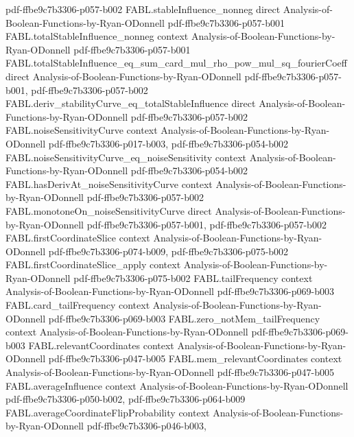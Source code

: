 \begin{theorem}
{    pdf-ffbe9c7b3306-p057-b002}
\proofstep
  {FABL.stableInfluence_nonneg}
  {direct}
  {Analysis-of-Boolean-Functions-by-Ryan-ODonnell}
  {pdf-ffbe9c7b3306-p057-b001}
\proofstep
  {FABL.totalStableInfluence_nonneg}
  {context}
  {Analysis-of-Boolean-Functions-by-Ryan-ODonnell}
  {pdf-ffbe9c7b3306-p057-b001}
\proofstep
  {FABL.totalStableInfluence_eq_sum_card_mul_rho_pow_mul_sq_fourierCoeff}
  {direct}
  {Analysis-of-Boolean-Functions-by-Ryan-ODonnell}
  {pdf-ffbe9c7b3306-p057-b001,
    pdf-ffbe9c7b3306-p057-b002}
\proofstep
  {FABL.deriv_stabilityCurve_eq_totalStableInfluence}
  {direct}
  {Analysis-of-Boolean-Functions-by-Ryan-ODonnell}
  {pdf-ffbe9c7b3306-p057-b002}
\proofstep
  {FABL.noiseSensitivityCurve}
  {context}
  {Analysis-of-Boolean-Functions-by-Ryan-ODonnell}
  {pdf-ffbe9c7b3306-p017-b003,
    pdf-ffbe9c7b3306-p054-b002}
\proofstep
  {FABL.noiseSensitivityCurve_eq_noiseSensitivity}
  {context}
  {Analysis-of-Boolean-Functions-by-Ryan-ODonnell}
  {pdf-ffbe9c7b3306-p054-b002}
\proofstep
  {FABL.hasDerivAt_noiseSensitivityCurve}
  {context}
  {Analysis-of-Boolean-Functions-by-Ryan-ODonnell}
  {pdf-ffbe9c7b3306-p057-b002}
\proofstep
  {FABL.monotoneOn_noiseSensitivityCurve}
  {direct}
  {Analysis-of-Boolean-Functions-by-Ryan-ODonnell}
  {pdf-ffbe9c7b3306-p057-b001,
    pdf-ffbe9c7b3306-p057-b002}
\proofstep
  {FABL.firstCoordinateSlice}
  {context}
  {Analysis-of-Boolean-Functions-by-Ryan-ODonnell}
  {pdf-ffbe9c7b3306-p074-b009,
    pdf-ffbe9c7b3306-p075-b002}
\proofstep
  {FABL.firstCoordinateSlice_apply}
  {context}
  {Analysis-of-Boolean-Functions-by-Ryan-ODonnell}
  {pdf-ffbe9c7b3306-p075-b002}
\proofstep
  {FABL.tailFrequency}
  {context}
  {Analysis-of-Boolean-Functions-by-Ryan-ODonnell}
  {pdf-ffbe9c7b3306-p069-b003}
\proofstep
  {FABL.card_tailFrequency}
  {context}
  {Analysis-of-Boolean-Functions-by-Ryan-ODonnell}
  {pdf-ffbe9c7b3306-p069-b003}
\proofstep
  {FABL.zero_notMem_tailFrequency}
  {context}
  {Analysis-of-Boolean-Functions-by-Ryan-ODonnell}
  {pdf-ffbe9c7b3306-p069-b003}
\proofstep
  {FABL.relevantCoordinates}
  {context}
  {Analysis-of-Boolean-Functions-by-Ryan-ODonnell}
  {pdf-ffbe9c7b3306-p047-b005}
\proofstep
  {FABL.mem_relevantCoordinates}
  {context}
  {Analysis-of-Boolean-Functions-by-Ryan-ODonnell}
  {pdf-ffbe9c7b3306-p047-b005}
\proofstep
  {FABL.averageInfluence}
  {context}
  {Analysis-of-Boolean-Functions-by-Ryan-ODonnell}
  {pdf-ffbe9c7b3306-p050-b002,
    pdf-ffbe9c7b3306-p064-b009}
\proofstep
  {FABL.averageCoordinateFlipProbability}
  {context}
  {Analysis-of-Boolean-Functions-by-Ryan-ODonnell}
  {pdf-ffbe9c7b3306-p046-b003,
}
\end{theorem}
